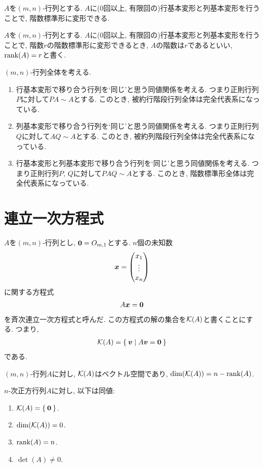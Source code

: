 \begin{prop}
  $A$を$(m,n)$-行列とする.
  $A$に($0$回以上, 有限回の)行基本変形と列基本変形を行うことで,
  階数標準形に変形できる.
\end{prop}
\begin{definition}
  $A$を$(m,n)$-行列とする.
  $A$に($0$回以上, 有限回の)行基本変形と列基本変形を行うことで,
  階数$r$の階数標準形に変形できるとき,
  $A$の階数は$r$であるといい,
  $\operatorname{rank}(A)=r$と書く.
\end{definition}

\begin{remark}
  $(m,n)$-行列全体を考える.
  \begin{enumerate}
  \item
    行基本変形で移り合う行列を`同じ'と思う同値関係を考える.
    つまり正則行列$P$に対して$PA\sim A$とする.
    このとき, 被約行階段行列全体は完全代表系になっている.
  \item
    列基本変形で移り合う行列を`同じ'と思う同値関係を考える.
    つまり正則行列$Q$に対して$AQ\sim A$とする.
    このとき, 被約列階段行列全体は完全代表系になっている.
   \item
    行基本変形と列基本変形で移り合う行列を`同じ'と思う同値関係を考える.
    つまり正則行列$P$, $Q$に対して$PAQ\sim A$とする.
    このとき, 階数標準形全体は完全代表系になっている.
  \end{enumerate}
\end{remark}

\section{連立一次方程式}
$A$を$(m,n)$-行列とし, $\boldsymbol{0}=O_{m,1}$とする.
$n$個の未知数
\begin{align*}
  \boldsymbol{x}=\begin{pmatrix}x_1\\\vdots\\x_n\end{pmatrix}
\end{align*}
に関する方程式
\begin{align*}
  A\boldsymbol{x}=\boldsymbol{0}
\end{align*}
を斉次連立一次方程式と呼んだ.
この方程式の解の集合を$\mathcal{K}(A)$と書くことにする.
つまり,
\begin{align*}
  \mathcal{K}(A)=\Set{\boldsymbol{v}|A\boldsymbol{v}=\boldsymbol{0}}
\end{align*}
である.
\begin{prop}
  $(m,n)$-行列$A$に対し,
  $\mathcal{K}(A)$はベクトル空間であり,
  $\dim(\mathcal{K}(A))=n-\operatorname{rank}(A)$.
\end{prop}
\begin{cor}
  $n$-次正方行列$A$に対し,
  以下は同値:
  \begin{enumerate}
  \item $\mathcal{K}(A)=\Set{\boldsymbol{0}}$.
  \item $\dim(\mathcal{K}(A))=0$.
  \item $\operatorname{rank}(A)= n$.
  \item $\det(A)\neq 0$.
  \end{enumerate}
\end{cor}

